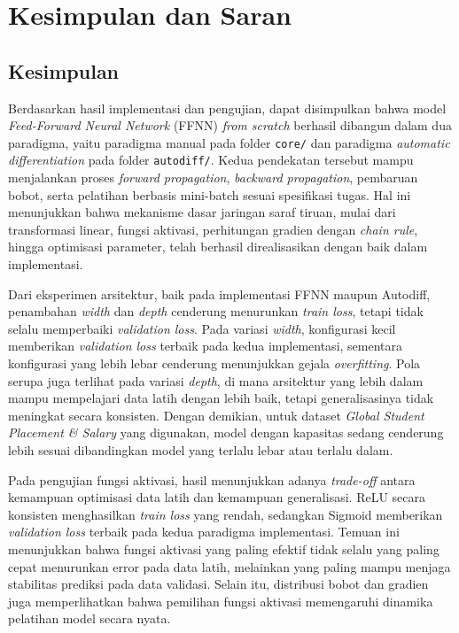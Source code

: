 
\chapter{Kesimpulan dan Saran}

\section{Kesimpulan}

Berdasarkan hasil implementasi dan pengujian, dapat disimpulkan bahwa model \textit{Feed-Forward Neural Network} (FFNN) \textit{from scratch} berhasil dibangun dalam dua paradigma, yaitu paradigma manual pada folder \texttt{core/} dan paradigma \textit{automatic differentiation} pada folder \texttt{autodiff/}. Kedua pendekatan tersebut mampu menjalankan proses \textit{forward propagation}, \textit{backward propagation}, pembaruan bobot, serta pelatihan berbasis mini-batch sesuai spesifikasi tugas. Hal ini menunjukkan bahwa mekanisme dasar jaringan saraf tiruan, mulai dari transformasi linear, fungsi aktivasi, perhitungan gradien dengan \textit{chain rule}, hingga optimisasi parameter, telah berhasil direalisasikan dengan baik dalam implementasi.

Dari eksperimen arsitektur, baik pada implementasi FFNN maupun Autodiff, penambahan \textit{width} dan \textit{depth} cenderung menurunkan \textit{train loss}, tetapi tidak selalu memperbaiki \textit{validation loss}. Pada variasi \textit{width}, konfigurasi kecil memberikan \textit{validation loss} terbaik pada kedua implementasi, sementara konfigurasi yang lebih lebar cenderung menunjukkan gejala \textit{overfitting}. Pola serupa juga terlihat pada variasi \textit{depth}, di mana arsitektur yang lebih dalam mampu mempelajari data latih dengan lebih baik, tetapi generalisasinya tidak meningkat secara konsisten. Dengan demikian, untuk dataset \textit{Global Student Placement \& Salary} yang digunakan, model dengan kapasitas sedang cenderung lebih sesuai dibandingkan model yang terlalu lebar atau terlalu dalam.

Pada pengujian fungsi aktivasi, hasil menunjukkan adanya \textit{trade-off} antara kemampuan optimisasi data latih dan kemampuan generalisasi. ReLU secara konsisten menghasilkan \textit{train loss} yang rendah, sedangkan Sigmoid memberikan \textit{validation loss} terbaik pada kedua paradigma implementasi. Temuan ini menunjukkan bahwa fungsi aktivasi yang paling efektif tidak selalu yang paling cepat menurunkan error pada data latih, melainkan yang paling mampu menjaga stabilitas prediksi pada data validasi. Selain itu, distribusi bobot dan gradien juga memperlihatkan bahwa pemilihan fungsi aktivasi memengaruhi dinamika pelatihan model secara nyata.

